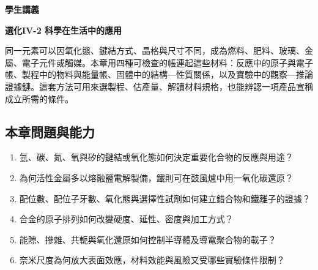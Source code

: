 \documentclass[11pt,a4paper]{article}
\providecommand{\tightlist}{%
  \setlength{\itemsep}{0pt}\setlength{\parskip}{0pt}}
\begin{document}
\begin{tcolorbox}[
  enhanced,colback=white,colframe=HandoutBlue,boxrule=1.1pt,arc=2mm,
  borderline west={3pt}{0pt}{HandoutBlue},left=5mm,right=4mm,top=4mm,bottom=4mm
]
{\sffamily\small\bfseries\color{HandoutBlue}學生講義}\par
{\sffamily\bfseries\LARGE\color{HandoutInk}選化IV-2 科學在生活中的應用}\par
\vspace{0.35em}{\large 由元素、鍵結與尺度，推導能源、金屬、電子與奈米材料的製程和用途}\par
{}\par
{}\par
\end{tcolorbox}


同一元素可以因氧化態、鍵結方式、晶格與尺寸不同，成為燃料、肥料、玻璃、金屬、電子元件或觸媒。本章用四種可檢查的帳連起這些材料：反應中的原子與電子帳、製程中的物料與能量帳、固體中的結構---性質關係，以及實驗中的觀察---推論證據鏈。這套方法可用來選製程、估產量、解讀材料規格，也能辨認一項產品宣稱成立所需的條件。

\begin{HandoutLearningMap}

\subsection{本章問題與能力}\label{ux672cux7ae0ux554fux984cux8207ux80fdux529b}

\begin{enumerate}
\def\labelenumi{\arabic{enumi}.}
\tightlist
\item
  氫、碳、氮、氧與矽的鍵結或氧化態如何決定重要化合物的反應與用途？
\item
  為何活性金屬多以熔融鹽電解製備，鐵則可在鼓風爐中用一氧化碳還原？
\item
  配位數、配位子牙數、氧化態與選擇性試劑如何建立錯合物和鐵離子的證據？
\item
  合金的原子排列如何改變硬度、延性、密度與加工方式？
\item
  能隙、摻雜、共軛與氧化還原如何控制半導體及導電聚合物的載子？
\item
  奈米尺度為何放大表面效應，材料效能與風險又受哪些實驗條件限制？
\end{enumerate}

\end{HandoutLearningMap}
\end{document}
